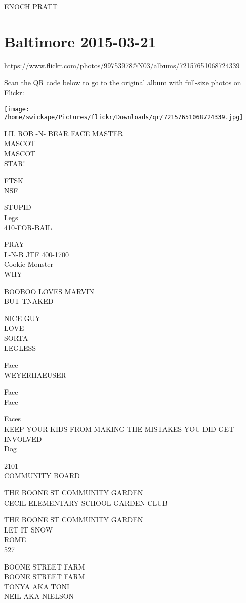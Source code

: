 \documentclass[10pt,letterpaper]{article}
\begin{document}
ENOCH PRATT
\pagebreak

\section*{Baltimore 2015-03-21}

\url{https://www.flickr.com/photos/99753978@N03/albums/72157651068724339}

Scan the QR code below to go to the original album with full-size photos on Flickr:

\texttt{[image: /home/swickape/Pictures/flickr/Downloads/qr/72157651068724339.jpg]}
\pagebreak

LIL ROB {-}N{-} BEAR FACE MASTER\\
MASCOT\\
MASCOT\\
STAR!

FTSK\\
NSF

STUPID\\
Legs\\
410{-}FOR{-}BAIL

PRAY\\
L{-}N{-}B JTF 400{-}1700\\
Cookie Monster\\
WHY

BOOBOO LOVES MARVIN\\
BUT TNAKED

NICE GUY\\
LOVE\\
SORTA\\
LEGLESS

Face\\
WEYERHAEUSER

Face\\
Face

Faces\\
KEEP YOUR KIDS FROM MAKING THE MISTAKES YOU DID GET INVOLVED\\
Dog

2101\\
COMMUNITY BOARD

THE BOONE ST COMMUNITY GARDEN\\
CECIL ELEMENTARY SCHOOL GARDEN CLUB

THE BOONE ST COMMUNITY GARDEN\\
LET IT SNOW\\
ROME\\
527

BOONE STREET FARM\\
BOONE STREET FARM\\
TONYA AKA TONI\\
NEIL AKA NIELSON
\end{document}
